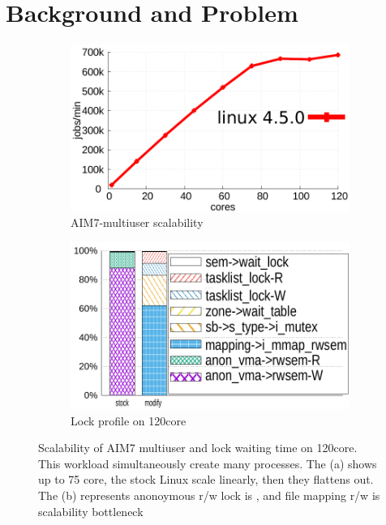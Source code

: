 \section{Background and Problem}


\begin{figure}
  \begin{subfigure}[b]{0.23\textwidth}
    \includegraphics[width=\textwidth]{graph/aim7_default}
    \caption{AIM7-multiuser scalability}
  \end{subfigure}%
  \begin{subfigure}[b]{0.25\textwidth}
    \includegraphics[width=\textwidth]{graph/lockstat}
    \caption{Lock profile on 120core}
  \end{subfigure}
  \centering
  \footnotesize {
  \caption{Scalability of AIM7 multiuser and lock waiting time on 120core.
  This workload simultaneously create many processes. The (a) shows up to 75
  core, the stock Linux scale linearly, then they flattens out. The (b)
  represents anonoymous r/w lock is , and file mapping r/w is scalability
  bottleneck}
  \label{fig:aim7_default} }
\end{figure}

